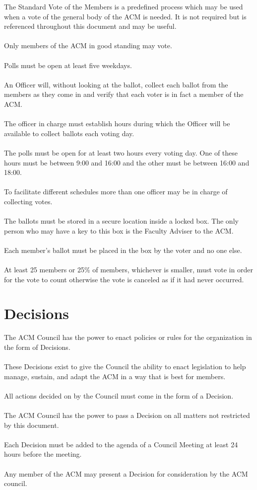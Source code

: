 \documentclass[12pt,titlepage]{article}
\begin{document}
The Standard Vote of the Members is a predefined process which may be used when a vote of the general body of the ACM is needed. It is not required but is referenced throughout this document and may be useful.\\
\\
Only members of the ACM in good standing may vote.\\
\\
Polls must be open at least five weekdays.\\
\\
An Officer will, without looking at the ballot, collect each ballot from the members as they come in and verify that each voter is in fact a member of the ACM.\\
\\
The officer in charge must establish hours during which the Officer will be available to collect ballots each voting day.\\
\\
The polls must be open for at least two hours every voting day. One of these hours must be between 9:00 and 16:00 and the other must be between 16:00 and 18:00.\\
\\
To facilitate different schedules more than one officer may be in charge of collecting votes.\\
\\
The ballots must be stored in a secure location inside a locked box. The only person who may have a key to this box is the Faculty Adviser to the ACM.\\
\\
Each member's ballot must be placed in the box by the voter and no one else.\\
\\
At least 25 members or 25\% of members, whichever is smaller, must vote in order for the vote to count otherwise the vote is canceled as if it had never occurred.

\section{Decisions}

The ACM Council has the power to enact policies or rules for the organization in the form of Decisions.\\
\\
These Decisions exist to give the Council the ability to enact legislation to help manage, sustain, and adapt the ACM in a way that is best for members.\\
\\
All actions decided on by the Council must come in the form of a Decision.\\
\\
The ACM Council has the power to pass a Decision on all matters not restricted by this document.\\
\\
Each Decision must be added to the agenda of a Council Meeting at least 24 hours before the meeting.\\
\\
Any member of the ACM may present a Decision for consideration by the ACM council.
\end{document}
